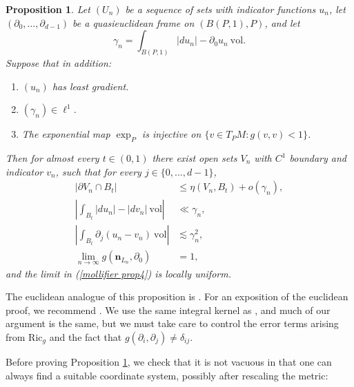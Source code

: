 \documentclass[reqno,12pt,letterpaper]{amsart}
\newcommand{\Ric}{\mathrm{Ric}}
\newcommand{\normal}{\mathbf n}
\newcommand{\vol}{\mathrm{vol}}
\newtheorem{proposition}[theorem]{Proposition}
\theoremstyle{definition}
\numberwithin{equation}{section}
\begin{document}
\begin{proposition}\label{mollifier proposition}
Let $(U_n)$ be a sequence of sets with indicator functions $u_n$, let $(\partial_0, \dots, \partial_{d - 1})$ be a quasieuclidean frame on $(B(P, 1), P)$, and let
$$\gamma_n = \int_{B(P, 1)} |du_n| - \partial_0u_n ~\vol.$$
Suppose that in addition:
\begin{enumerate}
\item $(u_n)$ has least gradient.
\item $(\gamma_n) \in \ell^1$.
\item The exponential map $\exp_P$ is injective on $\{v \in T_PM: g(v, v) < 1\}$.
\end{enumerate}

Then for almost every $t \in (0, 1)$ there exist open sets $V_n$ with $C^1$ boundary and indicator $v_n$, such that for every $j \in \{0, \dots, d - 1\}$,
\begin{align}
|\partial V_n \cap B_t| &\leq \eta(V_n, B_t) + o(\gamma_n), \label{mollifier prop1}\\
\left|\int_{B_t} |du_n| - |dv_n| ~\vol\right| &\ll \gamma_n, \label{mollifier prop2}\\
\left|\int_{B_t} \partial_j(u_n - v_n)~\vol\right| &\lesssim \gamma_n^2, \label{mollifier prop3}\\
\lim_{n \to \infty} g(\normal_{L_n}, \partial_0) &= 1, \label{mollifier prop4}
\end{align}
and the limit in (\ref{mollifier prop4}) is locally uniform.
\end{proposition}

The euclidean analogue of this proposition is \cite[Lemma 5.5]{Miranda66}.
For an exposition of the euclidean proof, we recommend \cite[Chapter 7]{Giusti77}.
We use the same integral kernel as \cite[Chapter 7]{Giusti77}, and much of our argument is the same, but we must take care to control the error terms arising from $\Ric_g$ and the fact that $g(\partial_i, \partial_j) \neq \delta_{ij}$.

Before proving Proposition \ref{mollifier proposition}, we check that it is not vacuous in that one can always find a suitable coordinate system, possibly after rescaling the metric:
\end{document}
